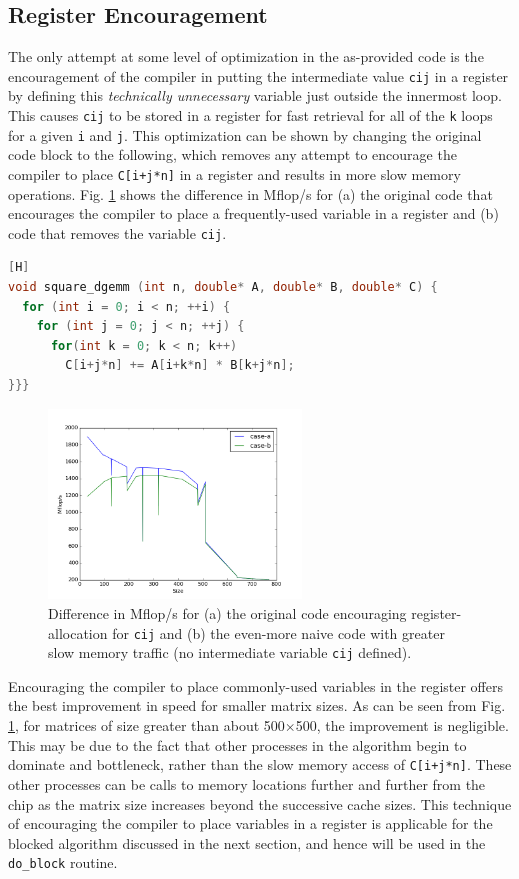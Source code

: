 \documentclass[10pt]{article}
\begin{document}
\subsection{Register Encouragement}
The only attempt at some level of optimization in the as-provided code is the encouragement of the compiler in putting the intermediate value {\tt cij} in a register by defining this \textit{technically unnecessary} variable just outside the innermost loop. This causes {\tt cij} to be stored in a register for fast retrieval for all of the {\tt k} loops for a given {\tt i} and {\tt j}. This optimization can be shown by changing the original code block to the following, which removes any attempt to encourage the compiler to place {\tt C[i+j*n]} in a register and results in more slow memory operations. Fig. \ref{fig:1} shows the difference in Mflop/s for (a) the original code that encourages the compiler to place a frequently-used variable in a register and (b) code that removes the variable {\tt cij}.

\begin{lstlisting}[language=C, basicstyle=\small][H]
void square_dgemm (int n, double* A, double* B, double* C) {
  for (int i = 0; i < n; ++i) {
    for (int j = 0; j < n; ++j) {
      for(int k = 0; k < n; k++)
        C[i+j*n] += A[i+k*n] * B[k+j*n];
}}}
\end{lstlisting}

\begin{figure}[H]
\centering
\includegraphics[width=0.6\textwidth]{figures/fig1.png}
\caption{Difference in Mflop/s for (a) the original code encouraging register-allocation for {\tt cij} and (b) the even-more naive code with greater slow memory traffic (no intermediate variable {\tt cij} defined).}
\label{fig:1}
\end{figure}

Encouraging the compiler to place commonly-used variables in the register offers the best improvement in speed for smaller matrix sizes. As can be seen from Fig. \ref{fig:1}, for matrices of size greater than about 500\(\times\)500, the improvement is negligible. This may be due to the fact that other processes in the algorithm begin to dominate and bottleneck, rather than the slow memory access of {\tt C[i+j*n]}. These other processes can be calls to memory locations further and further from the chip as the matrix size increases beyond the successive cache sizes. This technique of encouraging the compiler to place variables in a register is applicable for the blocked algorithm discussed in the next section, and hence will be used in the {\tt do\_block} routine.
\end{document}
